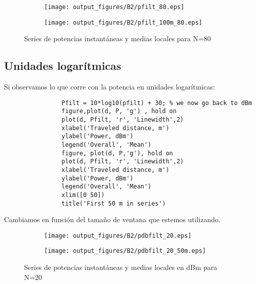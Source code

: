\documentclass{article}
\begin{document}
            \begin{figure}[h]
                \centering
                \begin{subfigure}
                    \centering          \texttt{[image: output\_figures/B2/pfilt\_80.eps]}
               \end{subfigure}
               \begin{subfigure}
                    \centering          \texttt{[image: output\_figures/B2/pfilt\_100m\_80.eps]}
               \end{subfigure}    
               \caption{Series de potencias instantáneas y medias locales para N=80}
                \label{fig:sup_rugosas}
            \end{figure}
            \clearpage
            \subsection{Unidades logarítmicas}
            \par Si observamos lo que corre con la potencia en unidades logarítmicas:
            \begin{lstlisting}
                Pfilt = 10*log10(pfilt) + 30; % we now go back to dBm  
                figure,plot(d, P, 'g') , hold on
                plot(d, Pfilt, 'r', 'Linewidth',2)
                xlabel('Traveled distance, m')
                ylabel('Power, dBm')
                legend('Overall', 'Mean')
                figure, plot(d, P,'g'), hold on
                plot(d, Pfilt, 'r', 'Linewidth',2)
                xlabel('Traveled distance, m')
                ylabel('Power, dBm')
                legend('Overall', 'Mean')
                xlim([0 50])
                title('First 50 m in series')
            \end{lstlisting}
            \par Cambiamos  en función del tamaño de ventana que estemos utilizando.
             \begin{figure}[h]
                \centering
                \begin{subfigure}
                    \centering          \texttt{[image: output\_figures/B2/pdbfilt\_20.eps]}
               \end{subfigure}
               \begin{subfigure}
                    \centering          \texttt{[image: output\_figures/B2/pdbfilt\_20\_50m.eps]}
               \end{subfigure}    
               \caption{Series de potencias instantáneas y medias locales en dBm para N=20}
                \label{fig:sup_rugosas}
            \end{figure}
            \clearpage
            
\end{document}

